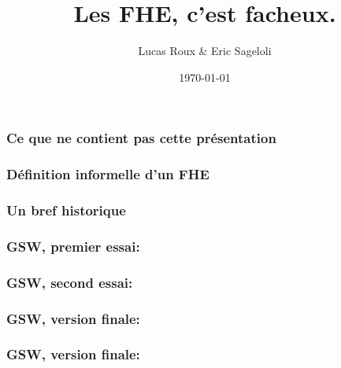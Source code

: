 \documentclass[15pt,usenames,dvipsnames]{beamer}
\title{Les FHE, c'est facheux.}
\date{\today}
\author{Lucas Roux \& Eric Sageloli}
\begin{document}

\begin{frame}
  \maketitle
\end{frame}


\begin{frame}
\frametitle{Ce que ne contient pas cette présentation}
\end{frame}


\begin{frame}
\frametitle{Définition informelle d'un FHE}
\end{frame}


\begin{frame} 
\frametitle{Un bref historique}
\end{frame} 


\begin{frame} 
\frametitle{GSW, premier essai:}
\end{frame} 

  
\begin{frame} 
\frametitle{GSW, second essai:}
\end{frame} 

  
\begin{frame} 
\frametitle{GSW, version finale:}
\end{frame} 
  
  
\begin{frame} 
\frametitle{GSW, version finale:}
\end{frame} 
\end{document}
